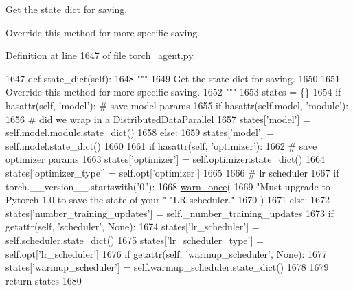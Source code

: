 \begin{DoxyVerb}Get the state dict for saving.

Override this method for more specific saving.
\end{DoxyVerb}
 

Definition at line 1647 of file torch\+\_\+agent.\+py.


\begin{DoxyCode}
1647     \textcolor{keyword}{def }state\_dict(self):
1648         \textcolor{stringliteral}{"""}
1649 \textcolor{stringliteral}{        Get the state dict for saving.}
1650 \textcolor{stringliteral}{}
1651 \textcolor{stringliteral}{        Override this method for more specific saving.}
1652 \textcolor{stringliteral}{        """}
1653         states = \{\}
1654         \textcolor{keywordflow}{if} hasattr(self, \textcolor{stringliteral}{'model'}):  \textcolor{comment}{# save model params}
1655             \textcolor{keywordflow}{if} hasattr(self.model, \textcolor{stringliteral}{'module'}):
1656                 \textcolor{comment}{# did we wrap in a DistributedDataParallel}
1657                 states[\textcolor{stringliteral}{'model'}] = self.model.module.state\_dict()
1658             \textcolor{keywordflow}{else}:
1659                 states[\textcolor{stringliteral}{'model'}] = self.model.state\_dict()
1660 
1661         \textcolor{keywordflow}{if} hasattr(self, \textcolor{stringliteral}{'optimizer'}):
1662             \textcolor{comment}{# save optimizer params}
1663             states[\textcolor{stringliteral}{'optimizer'}] = self.optimizer.state\_dict()
1664             states[\textcolor{stringliteral}{'optimizer\_type'}] = self.opt[\textcolor{stringliteral}{'optimizer'}]
1665 
1666         \textcolor{comment}{# lr scheduler}
1667         \textcolor{keywordflow}{if} torch.\_\_version\_\_.startswith(\textcolor{stringliteral}{'0.'}):
1668             \hyperlink{namespaceparlai_1_1utils_1_1misc_acf146e70ea7f6867969a7c2b545d4b4b}{warn\_once}(
1669                 \textcolor{stringliteral}{"Must upgrade to Pytorch 1.0 to save the state of your "} \textcolor{stringliteral}{"LR scheduler."}
1670             )
1671         \textcolor{keywordflow}{else}:
1672             states[\textcolor{stringliteral}{'number\_training\_updates'}] = self.\_number\_training\_updates
1673             \textcolor{keywordflow}{if} getattr(self, \textcolor{stringliteral}{'scheduler'}, \textcolor{keywordtype}{None}):
1674                 states[\textcolor{stringliteral}{'lr\_scheduler'}] = self.scheduler.state\_dict()
1675                 states[\textcolor{stringliteral}{'lr\_scheduler\_type'}] = self.opt[\textcolor{stringliteral}{'lr\_scheduler'}]
1676             \textcolor{keywordflow}{if} getattr(self, \textcolor{stringliteral}{'warmup\_scheduler'}, \textcolor{keywordtype}{None}):
1677                 states[\textcolor{stringliteral}{'warmup\_scheduler'}] = self.warmup\_scheduler.state\_dict()
1678 
1679         \textcolor{keywordflow}{return} states
1680 
\end{DoxyCode}

